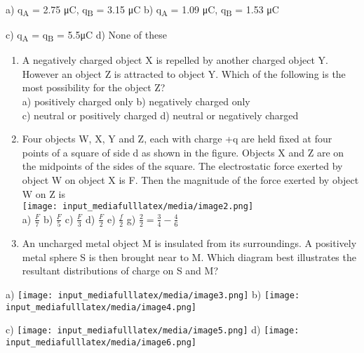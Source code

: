 a) q\textsubscript{A} = 2.75 μC, q\textsubscript{B} = 3.15 μC b)
q\textsubscript{A} = 1.09 μC, q\textsubscript{B} = 1.53 μC

c) q\textsubscript{A} = q\textsubscript{B} = 5.5μC d) None of these

\begin{enumerate}
\def\labelenumi{\arabic{enumi}.}
\setcounter{enumi}{1}
\item
  A negatively charged object X is repelled by another charged object Y.
  However an object Z is attracted to object Y. Which of the following
  is the most possibility for the object Z?\\
  a) positively charged only b) negatively charged only\\
  c) neutral or positively charged d) neutral or negatively charged
\item
  Four objects W, X, Y and Z, each with charge +q are held fixed at four
  points of a square of side d as shown in the figure. Objects X and Z
  are on the midpoints of the sides of the square. The electrostatic
  force exerted by object W on object X is F. Then the magnitude of the
  force exerted by object W on Z is\\
  \texttt{[image: input\_mediafulllatex/media/image2.png]}\\
  a) \(\frac{F}{7}\) b) \(\frac{F}{5}\) c) \(\frac{F}{3}\) d)
  \(\frac{F}{2}\) e) \(\frac{f}{2}\) g)
  \(\frac{2}{2} = \frac{3}{4} - \frac{4}{6}\)
\item
  An uncharged metal object M is insulated from its surroundings. A
  positively metal sphere S is then brought near to M. Which diagram
  best illustrates the resultant distributions of charge on S and M?
\end{enumerate}

a)
\texttt{[image: input\_mediafulllatex/media/image3.png]}
b)
\texttt{[image: input\_mediafulllatex/media/image4.png]}

c)
\texttt{[image: input\_mediafulllatex/media/image5.png]}
d)
\texttt{[image: input\_mediafulllatex/media/image6.png]}

